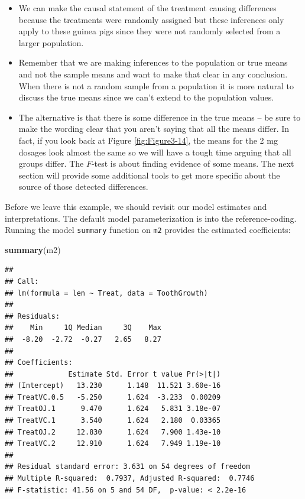 \documentclass[]{book}
\newenvironment{Shaded}{\begin{snugshade}}{\end{snugshade}}
\newcommand{\KeywordTok}[1]{\textcolor[rgb]{0.13,0.29,0.53}{\textbf{#1}}}
\newcommand{\NormalTok}[1]{#1}
\theoremstyle{definition}
\theoremstyle{definition}
\theoremstyle{remark}
\begin{document}
\begin{enumerate}
\begin{itemize}
    \begin{itemize}
    \item
      We can make the causal statement of the treatment causing
      differences because the treatments were randomly assigned but
      these inferences only apply to these guinea pigs since they were
      not randomly selected from a larger population.
    \item
      Remember that we are making inferences to the population or true
      means and not the sample means and want to make that clear in any
      conclusion. When there is not a random sample from a population it
      is more natural to discuss the true means since we can't extend to
      the population values.
    \item
      The alternative is that there is some difference in the true means
      -- be sure to make the wording clear that you aren't saying that
      all the means differ. In fact, if you look back at Figure
      \ref{fig:Figure3-14}, the means for the 2 mg dosages look almost
      the same so we will have a tough time arguing that all groups
      differ. The \(F\)-test is about finding evidence of some means.
      The next section will provide some additional tools to get more
      specific about the source of those detected differences.
    \end{itemize}
  \end{itemize}
\end{enumerate}

Before we leave this example, we should revisit our model estimates and
interpretations. The default model parameterization is into the
reference-coding. Running the model \texttt{summary} function on
\texttt{m2} provides the estimated coefficients:

\begin{Shaded}
\begin{Highlighting}[]
\KeywordTok{summary}\NormalTok{(m2)}
\end{Highlighting}
\end{Shaded}

\begin{verbatim}
## 
## Call:
## lm(formula = len ~ Treat, data = ToothGrowth)
## 
## Residuals:
##    Min     1Q Median     3Q    Max 
##  -8.20  -2.72  -0.27   2.65   8.27 
## 
## Coefficients:
##             Estimate Std. Error t value Pr(>|t|)
## (Intercept)   13.230      1.148  11.521 3.60e-16
## TreatVC.0.5   -5.250      1.624  -3.233  0.00209
## TreatOJ.1      9.470      1.624   5.831 3.18e-07
## TreatVC.1      3.540      1.624   2.180  0.03365
## TreatOJ.2     12.830      1.624   7.900 1.43e-10
## TreatVC.2     12.910      1.624   7.949 1.19e-10
## 
## Residual standard error: 3.631 on 54 degrees of freedom
## Multiple R-squared:  0.7937, Adjusted R-squared:  0.7746 
## F-statistic: 41.56 on 5 and 54 DF,  p-value: < 2.2e-16
\end{verbatim}
\end{document}
